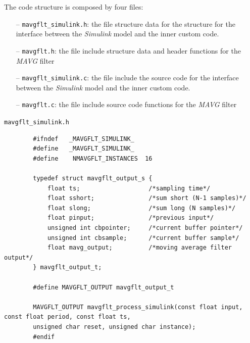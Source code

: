 \documentclass[11pt,a4paper,oneside]{book}
\numberwithin{equation}{section}
\theoremstyle{it}
\theoremstyle{definition}
\begin{document}
The code structure is composed by four files:
\begin{itemize}
	\item[--] {\selectfont \verb+mavgflt_simulink.h+}: the file structure data for the structure for the interface between the \textit{Simulink} model and the inner custom code.
	\item[--] {\selectfont \verb+mavgflt.h+}: the file include structure data and header functions for the \textit{MAVG} filter
	\item[--] {\selectfont \verb+mavgflt_simulink.c+}: the file include the source code for the interface between the \textit{Simulink} model and the inner custom code.
\item[--] {\selectfont \verb+mavgflt.c+}: the file include source code functions for the \textit{MAVG} filter
\end{itemize}	
\begin{mybox}
\begin{center}
	{\selectfont \verb+mavgflt_simulink.h+}
\end{center}
{\selectfont \footnotesize \noindent
	\begin{verbatim}
		#ifndef   _MAVGFLT_SIMULINK_
		#define   _MAVGFLT_SIMULINK_
		#define    NMAVGFLT_INSTANCES  16

		typedef struct mavgflt_output_s {
			float ts;                   /*sampling time*/
			float sshort;               /*sum short (N-1 samples)*/
			float slong;                /*sum long (N samples)*/
			float pinput;               /*previous input*/
			unsigned int cbpointer;     /*current buffer pointer*/
			unsigned int cbsample;      /*current buffer sample*/
			float mavg_output;          /*moving average filter output*/
		} mavgflt_output_t;
	
		#define MAVGFLT_OUTPUT mavgflt_output_t
	
		MAVGFLT_OUTPUT mavgflt_process_simulink(const float input, const float period, const float ts, 
		unsigned char reset, unsigned char instance);
		#endif
	\end{verbatim}}
\end{mybox}
\end{document}
